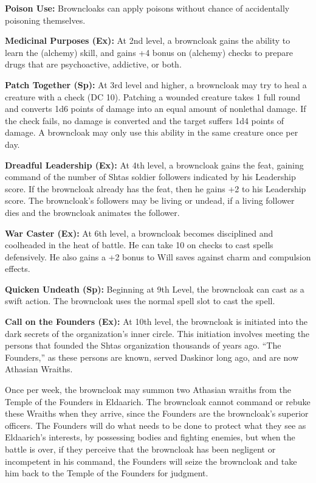 \textbf{Poison Use:} Browncloaks can apply poisons without chance of accidentally poisoning themselves.

\textbf{Medicinal Purposes (Ex):} At 2nd level, a browncloak gains the ability to learn the  (alchemy) skill, and gains +4 bonus on  (alchemy) checks to prepare drugs that are psychoactive, addictive, or both.

\textbf{Patch Together (Sp):} At 3rd level and higher, a browncloak may try to heal a creature with a  check (DC 10). Patching a wounded creature takes 1 full round and converts 1d6 points of damage into an equal amount of nonlethal damage. If the  check fails, no damage is converted and the target suffers 1d4 points of damage. A browncloak may only use this ability in the same creature once per day.

\textbf{Dreadful Leadership (Ex):} At 4th level, a browncloak gains the  feat, gaining command of the number of Shtas soldier followers indicated by his Leadership score. If the browncloak already has the  feat, then he gains +2 to his Leadership score. The browncloak's followers may be living or undead, if a living follower dies and the browncloak animates the follower.

\textbf{War Caster (Ex):} At 6th level, a browncloak becomes disciplined and coolheaded in the heat of battle. He can take 10 on  checks to cast spells defensively. He also gains a +2 bonus to Will saves against charm and compulsion effects.

\textbf{Quicken Undeath (Sp):} Beginning at 9th Level, the browncloak can cast  as a swift action. The browncloak uses the normal spell slot to cast the spell.

\textbf{Call on the Founders (Ex):} At 10th level, the browncloak is initiated into the dark secrets of the organization's inner circle. This initiation involves meeting the persons that founded the Shtas organization thousands of years ago. ``The Founders,'' as these persons are known, served Daskinor long ago, and are now Athasian Wraiths.

Once per week, the browncloak may summon two Athasian wraiths from the Temple of the Founders in Eldaarich. The browncloak cannot command or rebuke these Wraiths when they arrive, since the Founders are the browncloak's superior officers. The Founders will do what needs to be done to protect what they see as Eldaarich's interests, by possessing bodies and fighting enemies, but when the battle is over, if they perceive that the browncloak has been negligent or incompetent in his command, the Founders will seize the browncloak and take him back to the Temple of the Founders for judgment.


